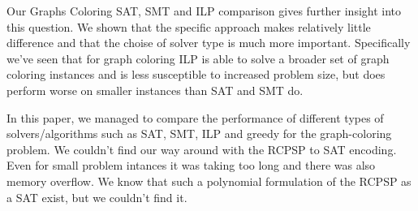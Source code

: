 \documentclass{sig-alternate}
\begin{document}
Our Graphs Coloring SAT, SMT and ILP comparison gives further insight into this question.
We shown that the specific approach makes relatively little difference and that the choise of solver type is much more important.
Specifically we've seen that for graph coloring ILP is able to solve a broader set of graph coloring instances and is less susceptible to increased problem size, but does perform worse on smaller instances than SAT and SMT do.

In this paper, we managed to compare the performance of different types of solvers/algorithms such as SAT, SMT, ILP and greedy for the graph-coloring problem.
We couldn't find our way around with the RCPSP to SAT encoding. Even for small problem intances it was taking too long and there was also memory overflow. We know that such a polynomial formulation of the RCPSP as a SAT exist, but we couldn't find it.
\end{document}
